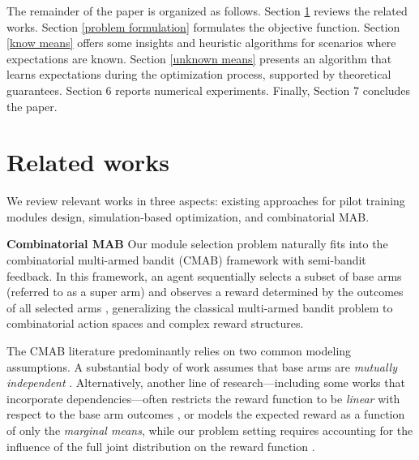 \documentclass[opre,sglanonrev]{informs4}
\begin{document}
The remainder of the paper is organized as follows. Section \ref{related works} reviews the related works. Section \ref{problem formulation} formulates the objective function. Section \ref{know means} offers some insights and heuristic algorithms for scenarios where expectations are known. Section \ref{unknown means} presents an algorithm that learns expectations during the optimization process, supported by theoretical guarantees. Section 6 reports numerical experiments. Finally, Section 7 concludes the paper.

\section{Related works}
\label{related works}
We review relevant works in three aspects: existing approaches for pilot training modules design, simulation-based optimization, and combinatorial MAB.

\textbf{Combinatorial MAB} Our module selection problem naturally fits into the combinatorial multi-armed bandit (CMAB) framework with semi-bandit feedback. In this framework, an agent sequentially selects a subset of base arms (referred to as a super arm) and observes a reward determined by the outcomes of all selected arms \citep{pmlr-v28-chen13a}, generalizing the classical multi-armed bandit problem to combinatorial action spaces and complex reward structures.

The CMAB literature predominantly relies on two common modeling assumptions. A substantial body of work assumes that base arms are \emph{mutually independent} \citep{10.5555/3737916.3740755, Combes2015CombinatorialBR, 10.1145/3410220.3453926}. Alternatively, another line of research—including some works that incorporate dependencies—often restricts the reward function to be \emph{linear} with respect to the base arm outcomes \citep{Degenne2016CombinatorialSW, Kveton2014MatroidBF, Kveton2014TightRB}, or models the expected reward as a function of only the \emph{marginal means}, while our problem setting requires accounting for the influence of the full joint distribution on the reward function \citep{Demirel2021CombinatorialGP, Kveton2015CombinatorialCB}.
\end{document}
